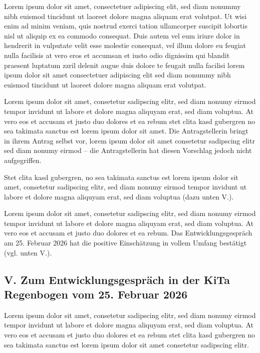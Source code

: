 \documentclass[
  11pt,
  a4paper,
]{article}
\begin{document}
Lorem ipsum dolor sit amet, consectetuer adipiscing elit, sed diam
nonummy nibh euismod tincidunt ut laoreet dolore magna aliquam erat
volutpat. Ut wisi enim ad minim veniam, quis nostrud exerci tation
ullamcorper suscipit lobortis nisl ut aliquip ex ea commodo consequat.
Duis autem vel eum iriure dolor in hendrerit in vulputate velit esse
molestie consequat, vel illum dolore eu feugiat nulla facilisis at vero
eros et accumsan et iusto odio dignissim qui blandit praesent luptatum
zzril delenit augue duis dolore te feugait nulla facilisi lorem ipsum
dolor sit amet consectetuer adipiscing elit sed diam nonummy nibh
euismod tincidunt ut laoreet dolore magna aliquam erat volutpat.

Lorem ipsum dolor sit amet, consetetur sadipscing elitr, sed diam nonumy
eirmod tempor invidunt ut labore et dolore magna aliquyam erat, sed diam
voluptua. At vero eos et accusam et justo duo dolores et ea rebum stet
clita kasd gubergren no sea takimata sanctus est lorem ipsum dolor sit
amet. Die Antragstellerin bringt in ihrem Antrag selbst vor, lorem ipsum
dolor sit amet consetetur sadipscing elitr sed diam nonumy eirmod -- die
Antragstellerin hat diesen Vorschlag jedoch nicht aufgegriffen.

Stet clita kasd gubergren, no sea takimata sanctus est lorem ipsum dolor
sit amet, consetetur sadipscing elitr, sed diam nonumy eirmod tempor
invidunt ut labore et dolore magna aliquyam erat, sed diam voluptua
(dazu unten V.).

Lorem ipsum dolor sit amet, consetetur sadipscing elitr, sed diam nonumy
eirmod tempor invidunt ut labore et dolore magna aliquyam erat, sed diam
voluptua. At vero eos et accusam et justo duo dolores et ea rebum. Das
Entwicklungsgespräch am 25. Februar 2026 hat die positive Einschätzung
in vollem Umfang bestätigt (vgl. unten V.).

\subsection{V. Zum Entwicklungsgespräch in der KiTa Regenbogen vom 25.
Februar
2026}\label{v.-zum-entwicklungsgespruxe4ch-in-der-kita-regenbogen-vom-25.-februar-2026}

Lorem ipsum dolor sit amet, consetetur sadipscing elitr, sed diam nonumy
eirmod tempor invidunt ut labore et dolore magna aliquyam erat, sed diam
voluptua. At vero eos et accusam et justo duo dolores et ea rebum stet
clita kasd gubergren no sea takimata sanctus est lorem ipsum dolor sit
amet consetetur sadipscing elitr.
\end{document}
